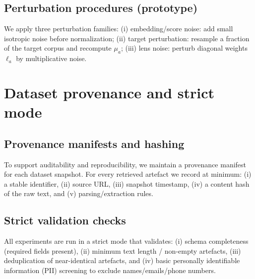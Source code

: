 \subsection{Perturbation procedures (prototype)}
We apply three perturbation families:
(i) {embedding/score noise:} add small isotropic noise before normalization;
(ii) {target perturbation:} resample a fraction of the target corpus and recompute $\mu_a$;
(iii) {lens noise:} perturb diagonal weights $\ell_a$ by multiplicative noise.

\section{Dataset provenance and strict mode}
\subsection{Provenance manifests and hashing}
To support auditability and reproducibility, we maintain a provenance manifest for each dataset snapshot.
For every retrieved artefact we record at minimum:
(i) a stable identifier, (ii) source URL, (iii) snapshot timestamp, (iv) a content hash of the raw text, and (v) parsing/extraction rules.

\subsection{Strict validation checks}
All experiments are run in a strict mode that validates:
(i) schema completeness (required fields present),
(ii) minimum text length / non-empty artefacts,
(iii) deduplication of near-identical artefacts,
and (iv) basic personally identifiable information (PII) screening to exclude names/emails/phone numbers.



%
%
